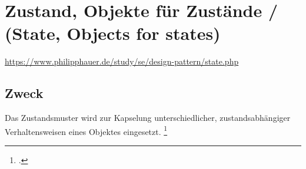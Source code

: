 \documentclass{bschlangaul-theorie}
\begin{document}

\chapter{Zustand, Objekte für Zustände / (State, Objects for states)}

\begin{liQuellen}
\item \cite{wiki:zustand}
\item \url{https://www.philipphauer.de/study/se/design-pattern/state.php}
\item \cite[PDF Seite 258-265]{gof}
\item \cite[Seite 69-81]{siebler}
\end{liQuellen}

\section{Zweck}

Das Zustandsmuster wird zur Kapselung unterschiedlicher,
zustandsabhängiger Verhaltensweisen eines Objektes eingesetzt.
\footcite{wiki:zustand}

\liEntwurfsZustand

\literatur
\end{document}
